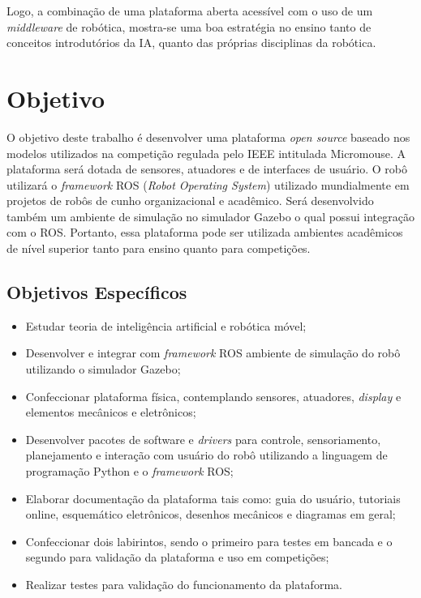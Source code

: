Logo, a combinação de uma plataforma aberta acessível com o uso de um \textit{middleware} de robótica, mostra-se uma boa estratégia no ensino tanto de conceitos introdutórios da IA, quanto das próprias disciplinas da robótica.


\section{Objetivo}
\label{sec:objetivo_geral}
O objetivo deste trabalho é desenvolver uma plataforma \textit{open source} baseado nos modelos utilizados na competição regulada pelo IEEE intitulada Micromouse. A plataforma será dotada de sensores, atuadores e de interfaces de usuário. O robô utilizará o \textit{framework} ROS (\textit{Robot Operating System}) utilizado mundialmente em projetos de robôs de cunho organizacional e acadêmico. Será desenvolvido também um ambiente de simulação no simulador Gazebo o qual possui integração com o ROS. Portanto, essa plataforma pode ser utilizada ambientes acadêmicos de nível superior tanto para ensino quanto para competições.

\subsection{Objetivos Específicos}
\label{ssec:objesp}
\begin{itemize}
	\item Estudar teoria de inteligência artificial e robótica móvel;
	\item Desenvolver e integrar com \textit{framework} ROS ambiente de simulação do robô utilizando o simulador Gazebo;
	\item Confeccionar plataforma física, contemplando sensores, atuadores, \textit{display} e elementos mecânicos e eletrônicos;
	\item Desenvolver pacotes de software e \textit{drivers} para controle, sensoriamento, planejamento e interação com usuário do robô utilizando a linguagem de programação Python e o \textit{framework} ROS;
	\item Elaborar documentação da plataforma tais como: guia do usuário, tutoriais online, esquemático eletrônicos, desenhos mecânicos e diagramas em geral;
	\item Confeccionar dois labirintos, sendo o primeiro para testes em bancada e o segundo para validação da plataforma e uso em competições;
	\item Realizar testes para validação do funcionamento da plataforma. 
	
\end{itemize}

